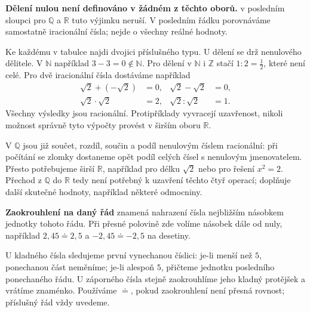 \documentclass[11pt,a4paper]{article}
\begin{document}
\textbf{Dělení nulou není definováno v žádném z těchto oborů.}
 v posledním sloupci pro $\mathbb Q$ a $\mathbb R$ tuto výjimku
neruší. V posledním řádku porovnáváme samostatně iracionální čísla;
nejde o všechny reálné hodnoty.

\begin{prikladReseniBox}[title={Příklad 3},breakable=false]
Ke každému  v tabulce najdi dvojici příslušného typu.
U dělení se drž nenulového dělitele.
\tcblower
V $\mathbb N$ například $3-3=0\notin\mathbb N$.
Pro dělení v $\mathbb N$ i $\mathbb Z$ stačí $1:2=\frac12$, které není celé.
Pro dvě iracionální čísla dostáváme například
\begin{align*}
\sqrt2+(-\sqrt2)&=0, & \sqrt2-\sqrt2&=0,\\
\sqrt2\cdot\sqrt2&=2, & \sqrt2:\sqrt2&=1.
\end{align*}
Všechny výsledky jsou racionální. Protipříklady vyvracejí uzavřenost,
nikoli možnost správně tyto výpočty provést v širším oboru $\mathbb R$.
\end{prikladReseniBox}

V $\mathbb Q$ jsou již součet, rozdíl, součin a podíl nenulovým číslem
racionální: při počítání se zlomky dostaneme opět podíl celých čísel
s nenulovým jmenovatelem. Přesto potřebujeme širší $\mathbb R$,
například pro délku $\sqrt2$ nebo pro řešení $x^2=2$.
Přechod z $\mathbb Q$ do $\mathbb R$ tedy není potřebný k uzavření
těchto čtyř operací; doplňuje další skutečné hodnoty, například některé odmocniny.


\newpage
{}
\begin{definiceBox}[title={Definice - Zaokrouhlení}]
\textbf{Zaokrouhlení na daný řád} znamená nahrazení čísla nejbližším
násobkem jednotky tohoto řádu. Při přesné polovině zde volíme násobek
dále od nuly, například $2{,}45\doteq2{,}5$ a $-2{,}45\doteq-2{,}5$ na desetiny.
\end{definiceBox}

U kladného čísla sledujeme první vynechanou číslici: je-li menší než $5$,
ponechanou část neměníme; je-li alespoň $5$, přičteme jednotku posledního
ponechaného řádu. U záporného čísla stejně zaokrouhlíme jeho kladný
protějšek a vrátíme znaménko. Používáme $\doteq$, pokud zaokrouhlení
není přesná rovnost; příslušný řád vždy uvedeme.
\end{document}
